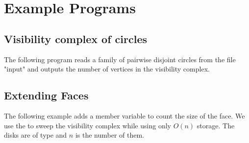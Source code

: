 \section{Example Programs}
\label{sectionVComplexExamples}

\subsection{Visibility complex of circles}
The following program reads a family of pairwise disjoint circles from the file
"input" and outputs the number of vertices in the visibility complex.


\subsection{Extending Faces}
The following example adds a  member variable to count the size of the
face. We use the  to sweep the visibility complex while using
only $O(n)$ storage. The disks are of type  and $n$ is the
number of them.




